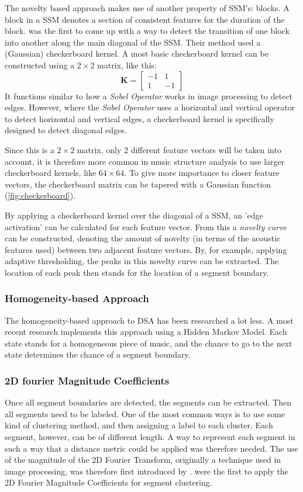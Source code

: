 The novelty based approach makes use of another property of SSM's: blocks. A block in a SSM denotes a section of consistent features for the duration of the block. \textcite{Foote2000automatic} was the first to come up with a way to detect the transition of one block into another along the main diagonal of the SSM. Their method used a (Gaussian) checkerboard kernel. A most basic checkerboard kernel can be constructed using a $2\times2$ matrix, like this:
$$\mathbf{K} = \begin{bmatrix} -1 & 1 \\ 1 & -1 \end{bmatrix}$$
It functions similar to how a \textit{Sobel Operator} works in image processing to detect edges. However, where the \textit{Sobel Operator} uses a horizontal and vertical operator to detect horizontal and vertical edges, a checkerboard kernel is specifically designed to detect diagonal edges.

Since this is a $2\times2$ matrix, only 2 different feature vectors will be taken into account, it is therefore more common in music structure analysis to use larger checkerboard kernels, like $64\times64$. To give more importance to closer feature vectors, the checkerboard matrix can be tapered with a Gaussian function (\autoref{fig:checkerboard}).

By applying a checkerboard kernel over the diagonal of a SSM, an 'edge activation' can be calculated for each feature vector. From this a \textit{novelty curve} can be constructed, denoting the amount of novelty (in terms of the acoustic features used) between two adjacent feature vectors. By, for example, applying adaptive thresholding, the peaks in this novelty curve can be extracted. The location of each peak then stands for the location of a segment boundary.

\subsubsection{Homogeneity-based Approach}
The homogeneity-based approach to DSA has been researched a lot less. A most recent research implements this approach using a Hidden Markov Model. Each state stands for a homogeneous piece of music, and the chance to go to the next state determines the chance of a segment boundary.

\subsubsection{2D fourier Magnitude Coefficients}
Once all segment boundaries are detected, the segments can be extracted. Then all segments need to be labeled. One of the most common ways is to use some kind of clustering method, and then assigning a label to each cluster. Each segment, however, can be of different length. A way to represent each segment in such a way that a distance metric could be applied was therefore needed. The use of the magnitude of the 2D Fourier Transform, originally a technique used in image processing, was therefore first introduced by \textcite{Ellis2007beat}. \textcite{Nieto2014music} were the first to apply the 2D Fourier Magnitude Coefficients for segment clustering.

